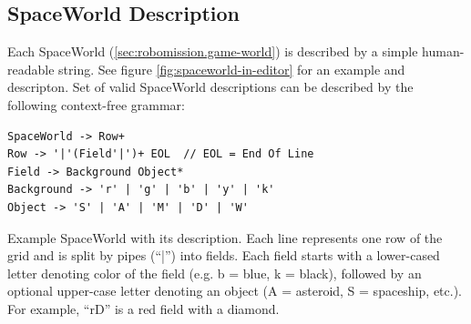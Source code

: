 \subsection{SpaceWorld Description}
\label{sec:impl.spaceworld}

Each SpaceWorld (\cref{sec:robomission.game-world}) is described by a simple
human-readable string.
See figure \ref{fig:spaceworld-in-editor} for an example and descripton.
Set of valid SpaceWorld descriptions can be described by the
following context-free grammar:

\begin{lstlisting}
SpaceWorld -> Row+
Row -> '|'(Field'|')+ EOL  // EOL = End Of Line
Field -> Background Object*
Background -> 'r' | 'g' | 'b' | 'y' | 'k'
Object -> 'S' | 'A' | 'M' | 'D' | 'W'
\end{lstlisting}





%
{Example SpaceWorld with its description. %
Each line represents one row of the grid
and is split by pipes (``|'') into fields.
Each field starts with a lower-cased letter denoting color of the field
(e.g. b = blue, k = black),
followed by an optional upper-case letter denoting an object
(A = asteroid, S = spaceship, etc.).
For example, ``rD'' is a red field with a diamond.}



